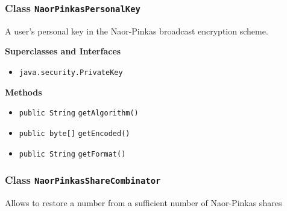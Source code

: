 \subsubsection{Class \lstinline|NaorPinkasPersonalKey|}
A user's personal key in the Naor-Pinkas broadcast encryption scheme. \\
\noindent\begin{minipage}[t]{5cm}
\vspace{0.3em}
\hspace*{2em}
\vspace{0.3em}
\end{minipage}



\textbf{\sffamily Superclasses and Interfaces}
\begin{itemize}
\item \lstinline|java.security.PrivateKey|
\end{itemize}



\textbf{\sffamily Methods}
\begin{itemize}
\item \lstinline|public String| \lstinline|getAlgorithm|\lstinline|()| \\[-0.6em]




\item \lstinline|public byte[]| \lstinline|getEncoded|\lstinline|()| \\[-0.6em]




\item \lstinline|public String| \lstinline|getFormat|\lstinline|()| \\[-0.6em]




\end{itemize}

\subsubsection{Class \lstinline|NaorPinkasShareCombinator|}
Allows to restore a number from a sufficient number of Naor-Pinkas shares \\
\noindent\begin{minipage}[t]{5cm}
\vspace{0.3em}
\hspace*{2em}
\vspace{0.3em}
\end{minipage}



